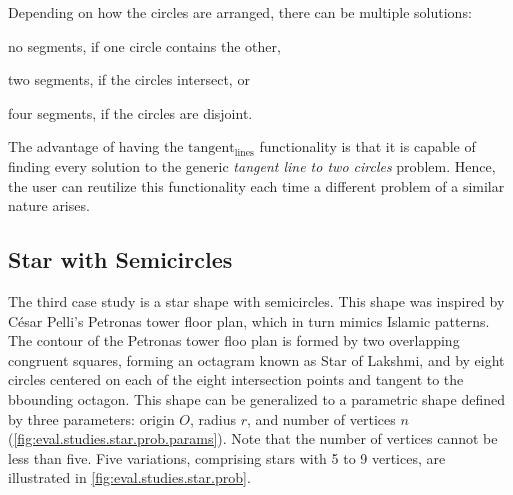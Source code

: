 Depending on how the circles are arranged, there can be multiple solutions:
\begin{enumerate*}
  \item no segments, if one circle contains the other,
  \item two segments, if the circles intersect, or
  \item four segments, if the circles are disjoint.
\end{enumerate*}
The advantage of having the $\mathrm{tangent_{lines}}$ functionality is that it
is capable of finding every solution to the generic \textit{tangent line to two
circles} problem.  Hence, the user can reutilize this functionality each time
a different problem of a similar nature arises.

\subsection{Star with Semicircles}%
\label{sec:eval.studies.star}

The third case study is a star shape with semicircles.  This shape was inspired
by César Pelli's Petronas tower floor plan, which in turn mimics Islamic
patterns.  The contour of the Petronas tower floo plan is formed by two
overlapping congruent squares, forming an octagram known as Star of Lakshmi, and
by eight circles centered on each of the eight intersection points and tangent
to the bbounding octagon.  This shape can be generalized to a parametric shape
defined by three parameters: origin $O$, radius $r$, and number of vertices $n$
(\cref{fig:eval.studies.star.prob.params}).  Note that the number of vertices
cannot be less than five.  Five variations, comprising stars with 5 to 9
vertices, are illustrated in \cref{fig:eval.studies.star.prob}.

